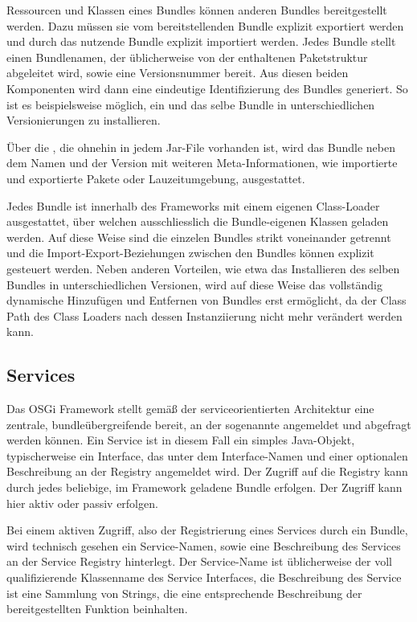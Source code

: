 Ressourcen und Klassen eines Bundles können anderen Bundles bereitgestellt
werden. Dazu müssen sie vom bereitstellenden Bundle explizit exportiert werden
und durch das nutzende Bundle explizit importiert werden. Jedes Bundle stellt einen
Bundlenamen, der üblicherweise von der enthaltenen Paketstruktur
abgeleitet wird, sowie eine Versionsnummer bereit. Aus diesen beiden Komponenten
wird dann eine eindeutige Identifizierung des Bundles generiert.
So ist es beispielsweise möglich, ein und das selbe Bundle in unterschiedlichen
Versionierungen zu installieren.

Über die , die ohnehin in jedem Jar-File vorhanden ist, wird
das Bundle neben dem Namen und der Version mit weiteren Meta-Informationen, wie
importierte und exportierte Pakete oder Lauzeitumgebung, ausgestattet.

Jedes Bundle ist innerhalb des Frameworks mit einem eigenen Class-Loader
ausgestattet, über welchen ausschliesslich die Bundle-eigenen Klassen geladen
werden. Auf diese Weise sind die einzelen Bundles strikt voneinander getrennt und die
Import-Export-Beziehungen zwischen den Bundles können explizit gesteuert
werden. 
Neben anderen Vorteilen, wie etwa das Installieren des selben Bundles in
unterschiedlichen Versionen, wird auf diese Weise das vollständig
dynamische Hinzufügen und Entfernen von Bundles erst ermöglicht, da der
Class Path des Class Loaders nach dessen Instanziierung nicht mehr verändert
werden kann.
\citep{wtherich_die_2008}

\subsection{Services} %
Das OSGi Framework stellt gemäß der serviceorientierten Architektur eine
zentrale, bundleübergreifende  bereit, an der
sogenannte  angemeldet und abgefragt werden können.
Ein Service ist in diesem Fall ein simples Java-Objekt, typischerweise ein
Interface, das unter dem Interface-Namen und einer optionalen Beschreibung an
der Registry angemeldet wird.
Der Zugriff auf die Registry kann durch jedes beliebige, im
Framework geladene Bundle erfolgen. Der Zugriff kann hier aktiv oder passiv
erfolgen.

Bei einem aktiven Zugriff, also der Registrierung eines Services durch ein
Bundle, wird technisch gesehen ein Service-Namen, sowie eine Beschreibung des
Services an der Service Registry hinterlegt. Der Service-Name ist üblicherweise
der voll qualifizierende Klassenname des Service Interfaces, die Beschreibung
des Service ist eine Sammlung von Strings, die eine entsprechende Beschreibung
der bereitgestellten Funktion beinhalten.

